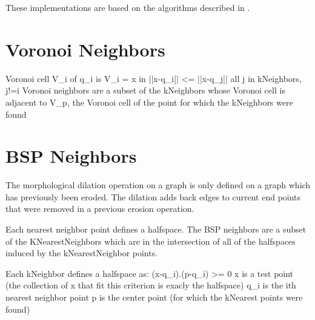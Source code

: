 \documentclass{InsightArticle}
\begin{document}
These implementations are based on the algorithms described in \cite{Pauly2003}.

\section{Voronoi Neighbors}
Voronoi cell V_i of q_i is
V_i = {x in ||x-q_i|| <= ||x-q_j|| all j in kNeighbors, j!=i}
Voronoi neighbors are a subset of the kNeighbors whose Voronoi cell is adjacent to V_p, 
the Voronoi cell of the point for which the kNeighbors were found

\section{BSP Neighbors}
The morphological dilation operation on a graph is only defined on a graph which has previously been eroded. The dilation adds back edges to current end points that were removed in a previous erosion operation.

Each nearest neighbor point defines a halfspace. The BSP neighbors are a subset of the KNearestNeighbors
which are in the intersection of all of the halfspaces induced by the kNearestNeighbor points.
  
Each kNeighbor defines a halfspace as:
(x-q_i).(p-q_i) >= 0
x is a test point (the collection of x that fit this criterion is exacly the halfspace)
q_i is the ith nearest neighbor point
p is the center point (for which the kNearest points were found)



\end{document}

